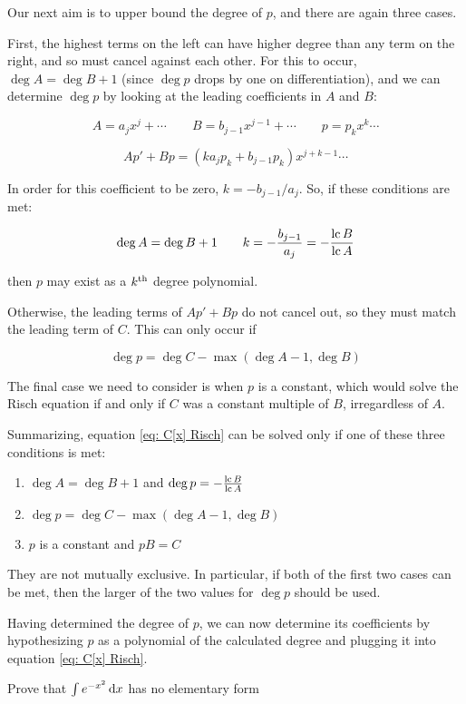 Our next aim is to upper bound the degree of $p$, and there are again three cases.

First, the highest terms on the left can have higher degree than any term on
the right, and so must cancel against each other.  For this to occur,
$\deg A = \deg B + 1$ (since $\deg p$ drops by one on differentiation),
and we can determine $\deg p$ by looking at the leading
coefficients in $A$ and $B$:

$$A = a_j x^j + \cdots \qquad B = b_{j-1} x^{j-1} + \cdots \qquad p = p_k x^k \cdots$$

$$A p' + B p = (k a_j p_k + b_{j-1} p_k) x^{j+k-1} \cdots$$

In order for this coefficient to be zero, $k=-b_{j-1}/a_j$.
So, if these conditions are met:

$$\deg A = \deg B + 1 \qquad k=-\frac{b_{j-1}}{a_j} = -\frac{{\rm lc\,} B}{{\rm lc\,} A}$$

then $p$ may exist as a $k^{\rm th}$ degree polynomial.

Otherwise, the leading terms of $A p' + B p$ do not cancel out,
so they must match the leading term of $C$.  This can only
occur if

$$\deg p = \deg C - \max(\deg A - 1, \deg B)$$

The final case we need to consider is when $p$ is a constant, which
would solve the Risch equation if and only if $C$ was a constant
multiple of $B$, irregardless of $A$.

Summarizing, equation \eqref{eq: C[x] Risch} can be solved only if one
of these three conditions is met:

\begin{enumerate}
\item $\deg A = \deg B + 1$ and $\deg p =-\frac{{\rm lc\,} B}{{\rm lc\,} A} $
\item $\deg p = \deg C - \max(\deg A - 1, \deg B)$
\item $p$ is a constant and $pB = C$
\end{enumerate}

They are not mutually exclusive.  In particular, if both of the first
two cases can be met, then the larger of the two values for $\deg p$
should be used.

Having determined the degree of $p$, we can now determine its
coefficients by hypothesizing $p$ as a polynomial of the calculated
degree and plugging it into equation \eqref{eq: C[x] Risch}.

\vfill\eject

\example
\label{exp e^{-x^2}}
Prove that $\int e^{-x^2}\, {\rm d}x$ has no elementary form

